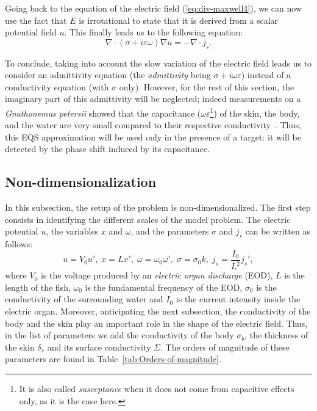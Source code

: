 Going back to the equation of the electric field
(\ref{eq:div-maxwell4}), we can now use the fact that ${E}$ is
irrotational to state that it is derived from a  scalar potential
field $u$. This finally leads us to the following equation:
\begin{equation}
\nabla\cdot(\sigma+i\varepsilon\omega)\nabla u=-\nabla\cdot
{j_{s}}.\label{eq:EQS-PDE}
\end{equation}


To conclude, taking into account the slow variation of the
electric field leads us to consider an admittivity equation (the \emph{admittivity} being
$\sigma + i \omega \varepsilon$) instead of a conductivity equation (\ie with $\sigma$ only).
However, for the rest of this section, the
imaginary part of this admittivity will be neglected; indeed
measurements on a \emph{Gnathonemus petersii} showed that the
capacitance (\ie $\omega \varepsilon$\footnote{It is also called \emph{susceptance} when it does
not come from capacitive effects only, as it is the case here.}) of the skin, the body, and the water are
very small compared to their respective
conductivity~\cite{caputi1998electric,scheich1973coding}. Thus,
this EQS approximation will be used only in the presence of a
target: it will be detected by the phase shift induced by its
capacitance.


\subsection{Non-dimensionalization} \label{nondimension}
In this subsection, the setup of the problem is
non-dimensionalized. The first step consists in identifying the
different scales of the model problem. The electric potential $u$,
the variables $x$ and $\omega$, and the parameters $\sigma$ and
${j_{s}}$ can be written as follows:
\[
u=V_{0}u',\;
x=Lx',\;\omega=\omega_{0}\omega',\;\sigma=\sigma_{0}k,\;
{j_{s}}=\frac{I_{0}}{L^{2}} {j_{s}'},
\]
 where $V_{0}$ is the voltage produced by an \emph{electric organ
discharge} (EOD), $L$ is the length of the fish, $\omega_{0}$ is
the fundamental frequency of the EOD, $\sigma_{0}$ is the
conductivity of the surrounding water and $I_{0}$ is the current
intensity inside the electric organ. Moreover, anticipating the
next subsection, the conductivity of the body and the skin play an
important role in the shape of the electric field. Thus, in the
list of parameters we add the conductivity of the body
$\sigma_{b}$, the thickness of the skin $\delta_s$ and its surface
conductivity $\Sigma$. The orders of magnitude of these parameters
are found in Table~\ref{tab:Orders-of-magnitude}.

